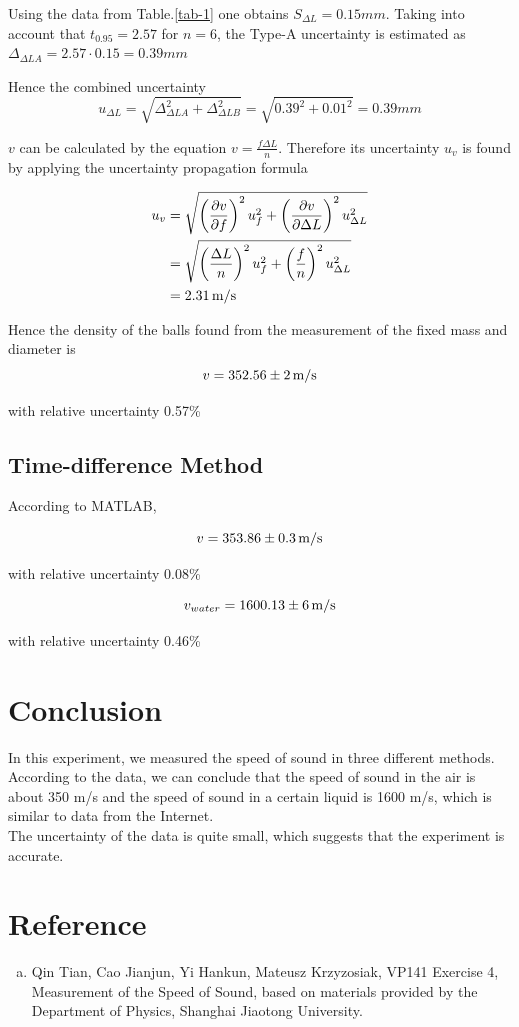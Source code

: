 \documentclass{article}
\begin{document}
Using the data from Table.\ref{tab-1} one obtains $S_{\Delta L}=0.15mm$. Taking into account that $t_{0.95}=2.57$ for $n=6$, the Type-A uncertainty is estimated as $\Delta_{\Delta L A}=2.57\cdot0.15=0.39mm$

Hence the combined uncertainty
$$u_{\Delta L}=\sqrt{\Delta^2_{\Delta L A}+\Delta^2_{\Delta L B}}=\sqrt{0.39^2+0.01^2}=0.39mm$$

$v$ can be calculated by the equation $v=\frac{f\Delta L}{n}$. Therefore its uncertainty $u_{v}$ is found by applying the uncertainty propagation formula

\begin{align*}
u_v&=\sqrt{\left(\frac{\partial v}{\partial f}\right)^2u_f^2+\left(\frac{\partial v}{\partial \Delta L}\right)^2u_{\Delta L}^2}\\
&=\sqrt{\left(\frac{\Delta L}{n}\right)^2u_f^2+\left(\frac{f}{n}\right)^2u_{\Delta L}^2}\\
&=2.31\,\rm{m/s}
\end{align*}

Hence the density of the balls found from the measurement of the fixed mass and diameter is
$$v=352.56\pm2\,\rm{m/s}$$

with relative uncertainty 0.57\%

\subsection{Time-difference Method}
According to MATLAB,

$$v=353.86\pm0.3\,\rm{m/s}$$

with relative uncertainty 0.08\%

$$v_{water}=1600.13\pm6\,\rm{m/s}$$

with relative uncertainty 0.46\%

\section{Conclusion}

In this experiment, we measured the speed of sound in three different methods.
\\

According to the data, we can conclude that the speed of sound in the air is about 350 m/s and the speed of sound in a certain liquid is 1600 m/s, which is similar to data from the Internet.
\\

The uncertainty of the data is quite small, which suggests that the experiment is accurate.

\section{Reference}
\begin{enumerate}[(a)]
	\item
	Qin Tian, Cao Jianjun, Yi Hankun, Mateusz Krzyzosiak, VP141 Exercise 4, Measurement of the Speed of Sound, based on materials provided by the Department of Physics, Shanghai Jiaotong University.
\end{enumerate}
\end{document}
